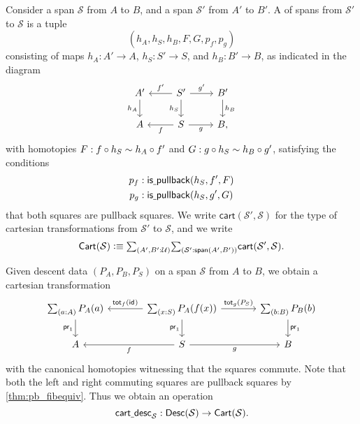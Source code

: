 \begin{defn}
Consider a span $\mathcal{S}$ from $A$ to $B$, and a span $\mathcal{S}'$ from $A'$ to $B'$. A  of spans from $\mathcal{S}'$ to $\mathcal{S}$ is a tuple
\begin{equation*}
(h_A,h_S,h_B,F,G,p_f,p_g)
\end{equation*}
consisting of maps $h_A:A'\to A$, $h_S:S'\to S$, and $h_B:B'\to B$, as indicated in the diagram
\begin{equation*}
\begin{tikzcd}
A' \arrow[d,swap,"h_A"]  & S' \arrow[l,swap,"{f'}"] \arrow[r,"{g'}"] \arrow[d,swap,"h_S"] & B' \arrow[d,"h_B"] \\
A & S \arrow[l,"f"] \arrow[r,swap,"g"] & B,
\end{tikzcd}
\end{equation*}
with homotopies $F:f\circ h_S\sim h_A\circ f'$ and $G:g\circ h_S\sim h_B\circ g'$, satisfying the conditions
\begin{align*}
p_f & : \mathsf{is\underline{\ }{}pullback}(h_S,f',F) \\
p_g & : \mathsf{is\underline{\ }{}pullback}(h_S,g',G)
\end{align*}
that both squares are pullback squares. We write $\mathsf{cart}(\mathcal{S}',\mathcal{S})$ for the type of cartesian transformations from $\mathcal{S}'$ to $\mathcal{S}$, and we write
\begin{equation*}
\mathsf{Cart}(\mathcal{S}) \defeq \sm{A',B':\UU}{\mathcal{S}':\mathsf{span}(A',B')}\mathsf{cart}(\mathcal{S}',\mathcal{S}).
\end{equation*}
\end{defn}

Given descent data $(P_A,P_B,P_S)$ on a span $\mathcal{S}$ from $A$ to $B$, we obtain a cartesian transformation
\begin{equation*}
\begin{tikzcd}[column sep=large]
\sm{a:A}P_A(a) \arrow[d,swap,"\proj 1"] & \sm{x:S}P_A(f(x)) \arrow[d,swap,"\proj 1"] \arrow[l,swap,"{\total[f]{\idfunc}}"] \arrow[r,"{\total[g]{P_S}}"] & \sm{b:B}P_B(b) \arrow[d,"\proj 1"] \\
A & S \arrow[l,"f"] \arrow[r,swap,"g"] & B
\end{tikzcd}
\end{equation*}
with the canonical homotopies witnessing that the squares commute. Note that both the left and right commuting squares are pullback squares by \cref{thm:pb_fibequiv}. Thus we obtain an operation
\begin{equation*}
\mathsf{cart\underline{\ }{}desc}_{\mathcal{S}}:\mathsf{Desc}(\mathcal{S})\to \mathsf{Cart}(\mathcal{S}).
\end{equation*}

